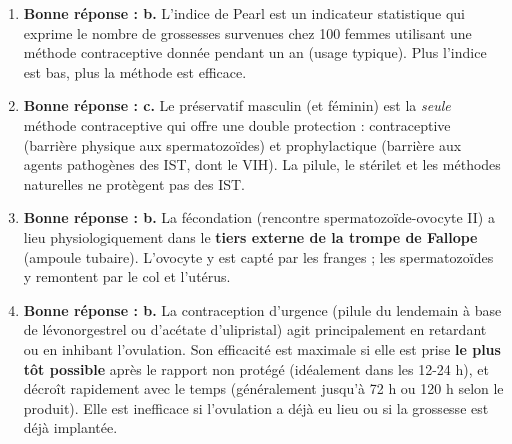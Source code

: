 \documentclass[11pt]{article}
\begin{document}
\begin{corrige}
\begin{enumerate}
\item \textbf{Bonne réponse : b.} L'indice de Pearl est un indicateur statistique qui exprime le nombre de grossesses survenues chez 100 femmes utilisant une méthode contraceptive donnée pendant un an (usage typique). Plus l'indice est bas, plus la méthode est efficace.
\item \textbf{Bonne réponse : c.} Le préservatif masculin (et féminin) est la \emph{seule} méthode contraceptive qui offre une double protection : contraceptive (barrière physique aux spermatozoïdes) et prophylactique (barrière aux agents pathogènes des IST, dont le VIH). La pilule, le stérilet et les méthodes naturelles ne protègent pas des IST.
\item \textbf{Bonne réponse : b.} La fécondation (rencontre spermatozoïde-ovocyte II) a lieu physiologiquement dans le \textbf{tiers externe de la trompe de Fallope} (ampoule tubaire). L'ovocyte y est capté par les franges ; les spermatozoïdes y remontent par le col et l'utérus.
\item \textbf{Bonne réponse : b.} La contraception d'urgence (pilule du lendemain à base de lévonorgestrel ou d'acétate d'ulipristal) agit principalement en retardant ou en inhibant l'ovulation. Son efficacité est maximale si elle est prise \textbf{le plus tôt possible} après le rapport non protégé (idéalement dans les 12-24 h), et décroît rapidement avec le temps (généralement jusqu'à 72 h ou 120 h selon le produit). Elle est inefficace si l'ovulation a déjà eu lieu ou si la grossesse est déjà implantée.
\end{enumerate}
\end{corrige}
\end{document}
